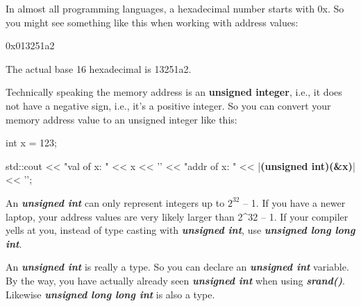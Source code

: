 In almost all programming languages, a hexadecimal number starts with 0x. So you might see something like this when working with address values:
\begin{center}
0x013251a2
\end{center}
The actual base 16 hexadecimal is 13251a2.

Technically speaking the memory address is an \textbf{unsigned integer}, i.e., it does not have a negative sign, i.e., it's a positive integer. So you can convert your memory address value to an unsigned integer like this:

\begin{consolethree}[escapeinside=||]
int x = 123;

std::cout << "val of x: " << x
          << '\n' << "addr of x: "
          << |\textbf{(unsigned int)(\&x)}| << '\n';
\end{consolethree}
An \emph{\textbf{unsigned int}} can only represent integers up to $2^{32}$ -- 1. If you have a newer laptop, your address values are very likely larger than 2\^{}32 -- 1. If your compiler yells at you, instead of type casting with \emph{\textbf{unsigned int}}, use \emph{\textbf{unsigned long long int}}.

An \emph{\textbf{unsigned int}} is really a type. So you can declare an \emph{\textbf{unsigned int}} variable. By the way, you have actually already seen \emph{\textbf{unsigned int}} when using \emph{\textbf{srand()}}. Likewise \emph{\textbf{unsigned long long int}} is also a type.







